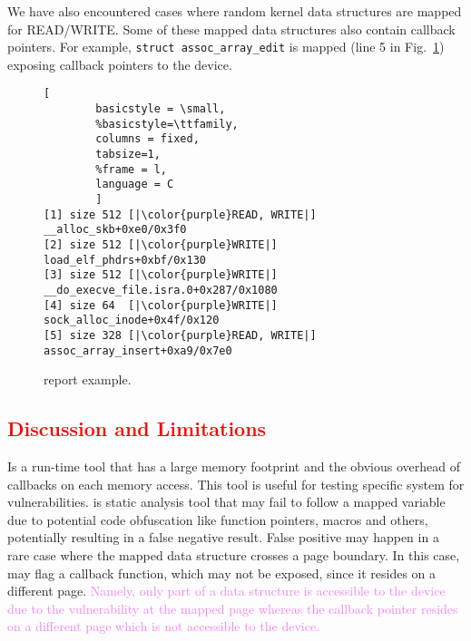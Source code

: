 We have also encountered cases where random kernel data structures are mapped for READ/WRITE. Some of these mapped data structures also contain callback pointers. For example, \texttt{struct assoc\_array\_edit} is mapped (line 5 in Fig.~\ref{fig:dkasan-report}) exposing callback pointers to the device. 
%
\begin{figure}[t]
\begin{adjustbox}{width=0.9\linewidth}
        \begin{lstlisting}[
        basicstyle = \small,
        %basicstyle=\ttfamily,
        columns = fixed,
        tabsize=1,
        %frame = l,
        language = C
        ]
[1] size 512 [|\color{purple}READ, WRITE|] __alloc_skb+0xe0/0x3f0
[2] size 512 [|\color{purple}WRITE|] load_elf_phdrs+0xbf/0x130
[3] size 512 [|\color{purple}WRITE|] __do_execve_file.isra.0+0x287/0x1080
[4] size 64  [|\color{purple}WRITE|] sock_alloc_inode+0x4f/0x120
[5] size 328 [|\color{purple}READ, WRITE|] assoc_array_insert+0xa9/0x7e0
        \end{lstlisting}
\end{adjustbox}
        \caption{\dkasan report example.}
        \label{fig:dkasan-report}
\end{figure}

\subsection{\textcolor{red}{Discussion and Limitations}}
\dkasan Is a run-time tool that has a large memory footprint and the obvious overhead of callbacks on each memory access. This tool is useful for testing specific system for vulnerabilities.
\tool is static analysis tool that may fail to follow a mapped variable due to potential code obfuscation like function pointers, macros and others, potentially resulting in a false negative result. False positive may happen in a rare case where the mapped  data  structure  crosses  a  page  boundary. In this case, \tool may flag a callback function, which may not be exposed, since it resides on a different page. \textcolor{violet}{Namely, only part of a data structure is accessible to the device due to the \subpage{} vulnerability at the mapped page whereas the callback pointer resides on a different page which is not accessible to the device.}